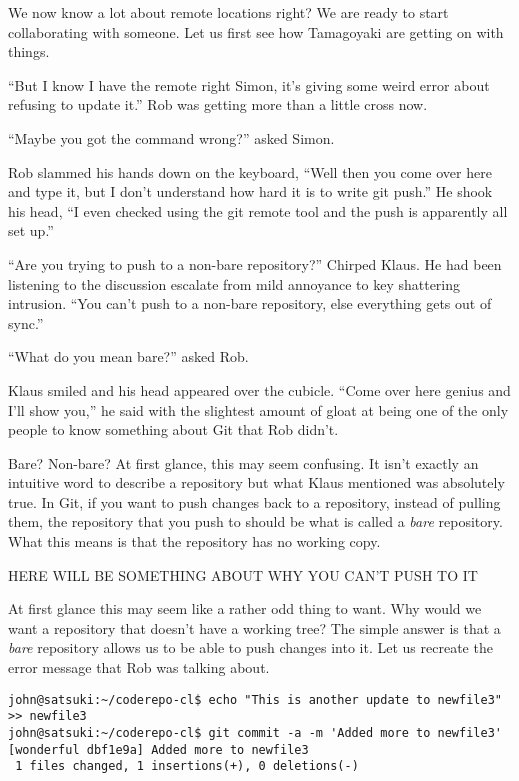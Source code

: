 \begin{trenches}
We now know a lot about remote locations right?  We are ready to start collaborating with someone.  Let us first see how Tamagoyaki are getting on with things.

``But I know I have the remote right Simon, it's giving some weird error about refusing to update it.''  Rob was getting more than a little cross now.  

``Maybe you got the command wrong?'' asked Simon.

Rob slammed his hands down on the keyboard, ``Well then you come over here and type it, but I don't understand how hard it is to write git push.''  He shook his head, ``I even checked using the git remote tool and the push is apparently all set up.''

``Are you trying to push to a non-bare repository?'' Chirped Klaus.  He had been listening to the discussion escalate from mild annoyance to key shattering intrusion.  ``You can't push to a non-bare repository, else everything gets out of sync.''

``What do you mean bare?'' asked Rob.

Klaus smiled and his head appeared over the cubicle.  ``Come over here genius and I'll show you,'' he said with the slightest amount of gloat at being one of the only people to know something about Git that Rob didn't.
\end{trenches}

Bare?  Non-bare?  At first glance, this may seem confusing.  It isn't exactly an intuitive word to describe a repository but what Klaus mentioned was absolutely true.  In Git, if you want to push changes back to a repository, instead of pulling them, the repository that you push to should be what is called a \emph{bare} repository.  What this means is that the repository has no working copy.

HERE WILL BE SOMETHING ABOUT WHY YOU CAN'T PUSH TO IT

At first glance this may seem like a rather odd thing to want.  Why would we want a repository that doesn't have a working tree?  The simple answer is that a \emph{bare} repository allows us to be able to push changes into it.  Let us recreate the error message that Rob was talking about.

\begin{Verbatim}[frame=leftline,framerule=1mm,fontsize=\relsize{-3}] 
john@satsuki:~/coderepo-cl$ echo "This is another update to newfile3" >> newfile3
john@satsuki:~/coderepo-cl$ git commit -a -m 'Added more to newfile3'
[wonderful dbf1e9a] Added more to newfile3
 1 files changed, 1 insertions(+), 0 deletions(-)
\end{Verbatim}


